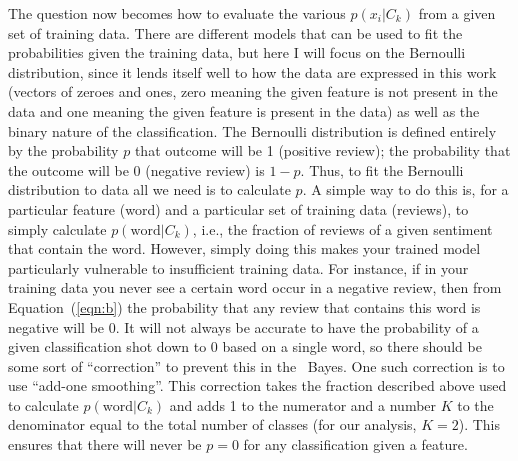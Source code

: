 The question now becomes how to evaluate the various $p(x_i| C_k)$ from a given set of training data.  There are different models that can be used to fit the probabilities given the training data, but here I will focus on the Bernoulli distribution, since it lends itself well to how the data are expressed in this work (vectors of zeroes and ones, zero meaning the given feature is not present in the data and one meaning the given feature is present in the data) as well as the binary nature of the classification.  The Bernoulli distribution is defined entirely by the probability $p$ that outcome will be 1 (positive review); the probability that the outcome will be 0 (negative review) is $1-p$.  Thus, to fit the Bernoulli distribution to data all we need is to calculate $p$.  A simple way to do this is, for a particular feature (word) and a particular set of training data (reviews), to simply calculate $p(\textrm{word}|C_k)$, i.e., the fraction of reviews of a given sentiment that contain the word.  However, simply doing this makes your trained model particularly vulnerable to insufficient training data.  For instance, if in your training data you never see a certain word occur in a negative review, then from Equation~(\ref{eqn:b}) the probability that any review that contains this word is negative will be 0.  It will not always be accurate to have the probability of a given classification shot down to 0 based on a single word, so there should be some sort of ``correction'' to prevent this in the \Na\ Bayes.  One such correction is to use ``add-one smoothing''.  This correction takes the fraction described above used to calculate $p(\textrm{word}|C_k)$ and adds 1 to the numerator and a number $K$ to the denominator equal to the total number of classes (for our analysis, $K=2$).  This ensures that there will never be $p=0$ for any classification given a feature.